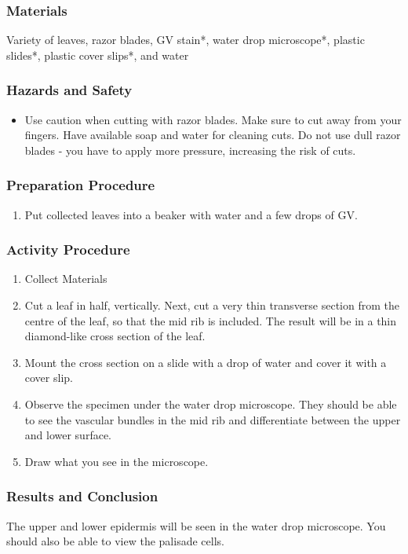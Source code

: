 \subsubsection*{Materials}
Variety of leaves, razor blades, GV stain*, water drop microscope*, plastic slides*, plastic cover slips*, and water

\subsubsection*{Hazards and Safety}
\begin{itemize}
\item{Use caution when cutting with razor blades. Make sure to cut away from your fingers. Have available soap and water for cleaning cuts. Do not use dull razor blades - you have to apply more pressure, increasing the risk of cuts.}
\end{itemize}

\subsubsection*{Preparation Procedure}
\begin{enumerate}
\item{Put collected leaves into a beaker with water and a few drops of GV.}
\end{enumerate}

\subsubsection*{Activity Procedure}
\begin{enumerate}
\item{Collect Materials}
\item{Cut a leaf in half, vertically. Next, cut a very thin transverse section from the centre of the leaf, so that the mid rib is included. The result will be in a thin diamond-like cross section of the leaf.}
\item{Mount the cross section on a slide with a drop of water and cover it with a cover slip.}
\item{Observe the specimen under the water drop microscope. They should be able to see the vascular bundles in the mid rib and differentiate between the upper and lower surface.}
\item{Draw what you see in the microscope.}
\end{enumerate}

\subsubsection*{Results and Conclusion}
The upper and lower epidermis will be seen in the water drop microscope. You should also be able to view the palisade cells.

